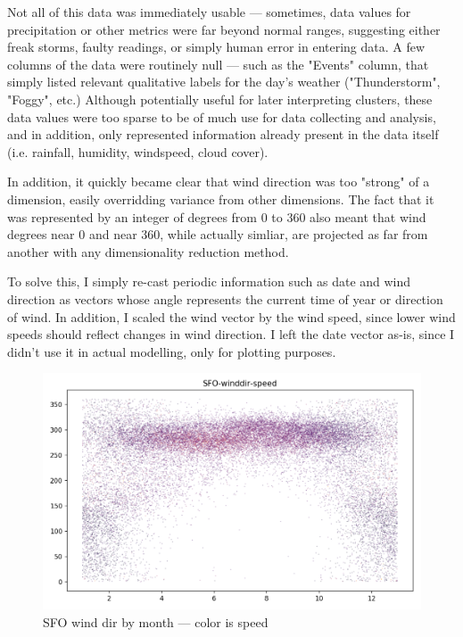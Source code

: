 \documentclass[a4paper]{article}
\begin{document}
Not all of this data was immediately usable --- sometimes, data values for precipitation or other metrics were far beyond normal ranges, suggesting either freak storms, faulty readings, or simply human error in entering data. A few columns of the data were routinely null --- such as the "Events" column, that simply listed relevant qualitative labels for the day's weather ("Thunderstorm", "Foggy", etc.) Although potentially useful for later interpreting clusters, these data values were too sparse to be of much use for data collecting and analysis, and in addition, only represented information already present in the data itself (i.e. rainfall, humidity, windspeed, cloud cover). 

In addition, it quickly became clear that wind direction was too "strong" of a dimension, easily overridding variance from other dimensions. The fact that it was represented by an integer of degrees from 0 to 360 also meant that wind degrees near 0 and near 360, while actually simliar, are projected as far from another with any dimensionality reduction method. 

To solve this, I simply re-cast periodic information such as date and wind direction as vectors whose angle represents the current time of year or direction of wind. In addition, I scaled the wind vector by the wind speed, since lower wind speeds should reflect changes in wind direction. I left the date vector as-is, since I didn't use it in actual modelling, only for plotting purposes.
 
\begin{figure}[t]
  \centering
  \includegraphics[width=\linewidth]{../png/basic-vis/SFO-winddir-speed.png}
  \caption{SFO wind dir by month --- color is speed}
  \label{fig:SFO_dir_speed}
\end{figure}
\end{document}
